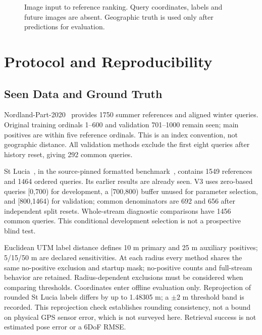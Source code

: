 \documentclass[conference]{IEEEtran}
\begin{document}
\begin{figure}[t]\centering
{}
\caption{Image input to reference ranking. Query coordinates, labels and future images are absent. Geographic truth is used only after predictions for evaluation.}\label{fig:pipeline}
\end{figure}

\section{Protocol and Reproducibility}
\subsection{Seen Data and Ground Truth}
Nordland-Part-2020~\cite{nordland} provides 1750 summer references and aligned winter queries. Original training ordinals 1--600 and validation 701--1000 remain seen; main positives are within five reference ordinals. This is an index convention, not geographic distance. All validation methods exclude the first eight queries after history reset, giving 292 common queries.

St Lucia~\cite{stlucia}, in the source-pinned formatted benchmark~\cite{benchmark}, contains 1549 references and 1464 ordered queries. Its earlier results are already seen. V3 uses zero-based queries [0,700) for development, a [700,800) buffer unused for parameter selection, and [800,1464) for validation; common denominators are 692 and 656 after independent split resets. Whole-stream diagnostic comparisons have 1456 common queries. This conditional development selection is not a prospective blind test.

Euclidean UTM label distance defines 10 m primary and 25 m auxiliary positives; 5/15/50 m are declared sensitivities. At each radius every method shares the same no-positive exclusion and startup mask; no-positive counts and full-stream behavior are retained. Radius-dependent exclusions must be considered when comparing thresholds. Coordinates enter offline evaluation only. Reprojection of rounded St Lucia labels differs by up to 1.48305 m; a $\pm2$ m threshold band is recorded. This reprojection check establishes rounding consistency, not a bound on physical GPS sensor error, which is not surveyed here. Retrieval success is not estimated pose error or a 6DoF RMSE.
\end{document}
